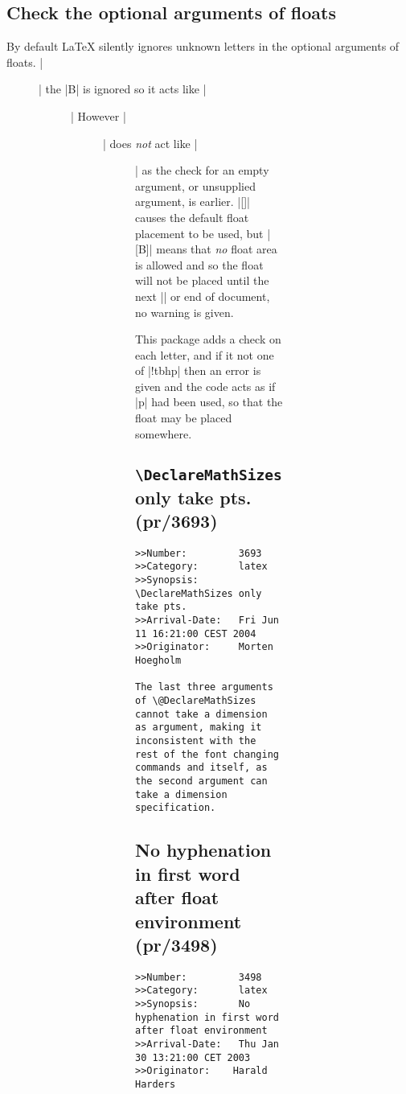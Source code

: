 \documentclass{ltxguide}
\begin{document}
\subsection{Check the optional arguments of floats}

By default LaTeX silently ignores unknown letters in the optional
arguments of floats. |\begin{figure}[tB]| the |B| is ignored so it
acts like |\begin{figure}[t]| However |\begin{figure}[B]| does
\emph{not} act like |\begin{figure}[]| as the check for an empty
argument, or unsupplied argument, is earlier. |[]| causes the
default float placement to be used, but |[B]| means that \emph{no}
float area is allowed and so the float will not be placed until the
next |\clearpage| or end of document, no warning is given.

This package adds a check on each letter, and if it not one of
|!tbhp| then an error is given and the code acts as if |p| had been
used, so that the float may be placed somewhere.

\subsection{\texttt{\textbackslash DeclareMathSizes} only take pts.
    (pr/3693)}

\begin{verbatim}
>>Number:         3693
>>Category:       latex
>>Synopsis:       \DeclareMathSizes only take pts.
>>Arrival-Date:   Fri Jun 11 16:21:00 CEST 2004
>>Originator:     Morten Hoegholm

The last three arguments of \@DeclareMathSizes cannot take a dimension
as argument, making it inconsistent with the rest of the font changing
commands and itself, as the second argument can take a dimension
specification.
\end{verbatim}

\subsection{No hyphenation in first word after float environment (pr/3498)}

\begin{verbatim}
>>Number:         3498
>>Category:       latex
>>Synopsis:       No hyphenation in first word after float environment
>>Arrival-Date:   Thu Jan 30 13:21:00 CET 2003
>>Originator:    Harald Harders


\end{verbatim}
\end{figure}
\end{figure}
\end{figure}
\end{figure}
\end{document}
